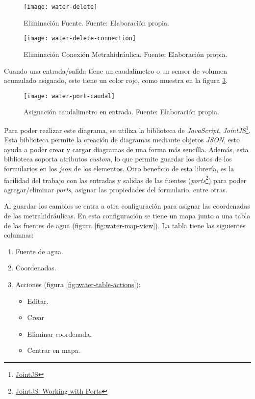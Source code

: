 \begin{figure}[H]
	\centering
	\texttt{[image: water-delete]}
	\caption{\label{fig:water-delete} Eliminación Fuente. Fuente: Elaboración propia.}
\end{figure}

\begin{figure}[H]
	\centering
	\texttt{[image: water-delete-connection]}
	\caption{\label{fig:water-delete-connection} Eliminación Conexión Metrahidráulica. Fuente: Elaboración propia.}
\end{figure}

Cuando una entrada/salida tiene un caudalímetro o un sensor de volumen acumulado asignado, este tiene un color rojo, como muestra en la figura \ref{fig:water-port-caudal}.

\begin{figure}[H]
	\centering
	\texttt{[image: water-port-caudal]}
	\caption{\label{fig:water-port-caudal} Asignación caudalimetro en entrada. Fuente: Elaboración propia.}
\end{figure}

Para poder realizar este diagrama, se utiliza la biblioteca de \textit{JavaScript}, \textit{JointJS}\footnote{\href{https://www.jointjs.com/}{JointJS}}. 
Esta biblioteca permite la creación de diagramas mediante objetos \textit{JSON}, esto ayuda a poder crear y cargar diagramas de una forma más sencilla. Además, esta biblioteca soporta atributos \textit{custom}, lo que permite guardar los datos de los formularios en los \textit{json} de los elementos.
Otro beneficio de esta librería, es la facilidad del trabajo con las entradas y salidas de las fuentes (\textit{ports}\footnote{\href{https://resources.jointjs.com/tutorial/ports}{JointJS: Working with Ports}}) para poder agregar/eliminar \textit{ports}, asignar las propiedades del formulario, entre otras.

Al guardar los cambios se entra a otra configuración para asignar las coordenadas de las metrahidráulicas.
En esta configuración se tiene un mapa junto a una tabla de las fuentes de agua (figura \ref{fig:water-map-view}). La tabla tiene las siguientes columnas:
\begin{enumerate}
    \item Fuente de agua.
    \item Coordenadas.
    \item Acciones (figura \ref{fig:water-table-actions}):
          \begin{itemize}
            \item Editar.
            \item Crear
            \item Eliminar coordenada.
            \item Centrar en mapa.
          \end{itemize}
\end{enumerate}

